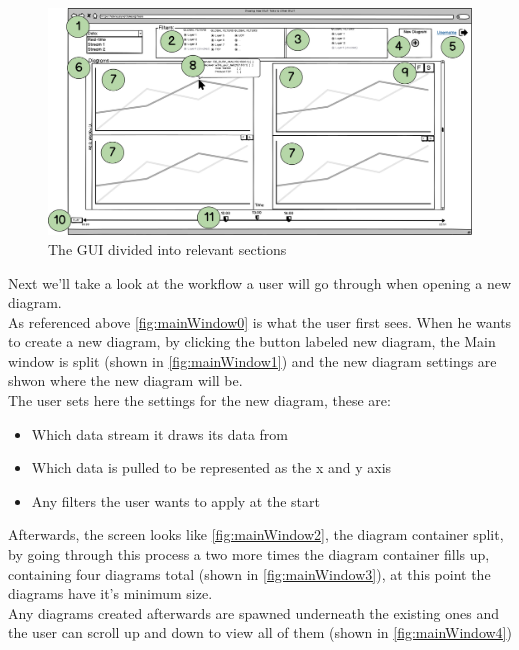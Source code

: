 \documentclass[twoside, english, draft]{Pflichtenheft}
\begin{document}
\vfill

\begin{figure}[ht]
\centering
\includegraphics[width=\textwidth]{Images/07MW.png}
	\caption{The GUI divided into relevant sections}
	\label{fig:mainWindow5}
\end{figure}

\vfill
\clearpage

Next we'll take a look at the workflow a user will go through when opening a new diagram.
\\
As referenced above \autoref{fig:mainWindow0} is what the user first sees. When he wants to create a new diagram, by clicking the button labeled new diagram, the Main window is split (shown in \autoref{fig:mainWindow1}) and the new diagram settings are shwon where the new diagram will be.
\\
The user sets here the settings for the new diagram, these are: 
\\
\begin{itemize}
\item{Which data stream it draws its data from}
\item{Which data is pulled to be represented as the x and y axis}
\item{Any filters the user wants to apply at the start}
\end{itemize}

Afterwards, the screen looks like \autoref{fig:mainWindow2}, the diagram container split, by going through this process a two more times the diagram container fills up, containing four diagrams total (shown in \autoref{fig:mainWindow3}), at this point the diagrams have it's minimum size.
\\
Any diagrams created afterwards are spawned underneath the existing ones and the user can scroll up and down to view all of them (shown in \autoref{fig:mainWindow4})
\end{document}
